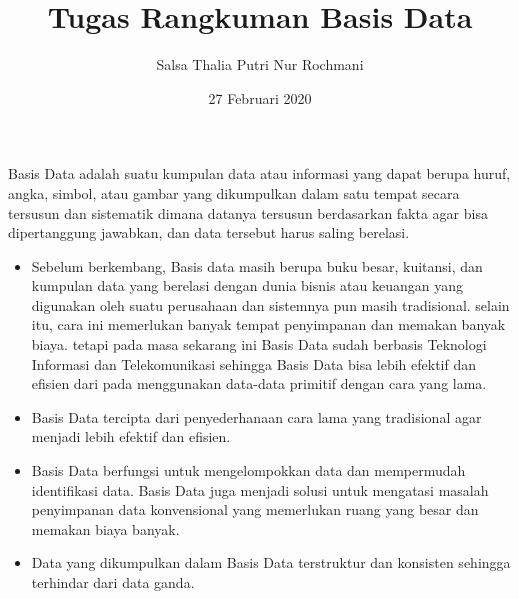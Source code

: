 \documentclass[12pt, times new roman, a4paper]{article}
\title{Tugas Rangkuman Basis Data}
\author{Salsa Thalia Putri Nur Rochmani}
\date{27 Februari 2020}
\begin{document}
\maketitle

Basis Data adalah suatu kumpulan data atau informasi yang dapat berupa huruf, angka, simbol, atau gambar yang dikumpulkan dalam satu tempat secara tersusun dan sistematik dimana datanya tersusun berdasarkan fakta agar bisa dipertanggung jawabkan, dan data tersebut harus saling berelasi.

\begin{itemize}
  \item Sebelum berkembang, Basis data masih berupa buku besar, kuitansi, dan kumpulan data yang berelasi dengan dunia bisnis atau keuangan yang digunakan oleh suatu perusahaan dan sistemnya pun masih tradisional. selain itu, cara ini memerlukan banyak tempat penyimpanan dan memakan banyak biaya. tetapi pada masa sekarang ini Basis Data sudah berbasis Teknologi Informasi dan Telekomunikasi sehingga Basis Data bisa lebih efektif dan efisien dari pada menggunakan data-data primitif dengan cara yang lama.
  \item Basis Data tercipta dari penyederhanaan cara lama yang tradisional agar  menjadi lebih efektif dan efisien. 
  \item Basis Data berfungsi untuk mengelompokkan data dan mempermudah identifikasi data. Basis Data juga menjadi solusi untuk mengatasi masalah penyimpanan data konvensional yang memerlukan ruang yang besar dan memakan biaya banyak.
  \item Data yang dikumpulkan dalam Basis Data terstruktur dan konsisten sehingga terhindar dari data ganda.
  
\end{itemize}
\end{document}
